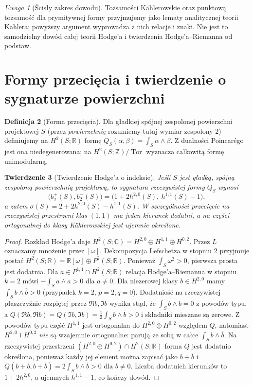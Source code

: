 \documentclass[11pt,a4paper,oneside]{report}
\newcommand{\R}{\mathbb{R}}
\newcommand{\C}{\mathbb{C}}
\newcommand{\Z}{\mathbb{Z}}
\theoremstyle{plain}
\newtheorem{twierdzenie}{Twierdzenie}[section]
\theoremstyle{definition}
\newtheorem{definicja}[twierdzenie]{Definicja}
\theoremstyle{remark}
\newtheorem{uwaga}[twierdzenie]{Uwaga}
\begin{document}
\begin{uwaga}[Ścisły zakres dowodu]
Tożsamości Kählerowskie oraz punktową tożsamość dla
prymitywnej formy przyjmujemy jako lematy analitycznej
teorii Kählera; powyższy argument wyprowadza z nich
relacje i znaki. Nie jest to samodzielny dowód całej
teorii Hodge'a i twierdzenia Hodge'a--Riemanna od podstaw.
\end{uwaga}

\section{Formy przecięcia i twierdzenie o sygnaturze powierzchni}
\begin{definicja}[Forma przecięcia]
Dla gładkiej spójnej zespolonej powierzchni projektowej $S$
(przez \emph{powierzchnię} rozumiemy tutaj wymiar zespolony $2$)
definiujemy na $H^2(S;\R)$ formę
$Q_S(\alpha,\beta)=\int_S\alpha\wedge\beta$.
Z dualności Poincarégo jest ona niedegenerowana;
na $H^2(S;\Z)/\operatorname{Tor}$ wyznacza całkowitą
formę unimodularną.
\end{definicja}
\begin{twierdzenie}[Twierdzenie Hodge'a o indeksie]
\label{thm:xvii-hodge-index}
Jeśli $S$ jest gładką, spójną zespoloną powierzchnią projektową,
to sygnatura rzeczywistej formy $Q_S$ wynosi
\[
\bigl(b_2^+(S),b_2^-(S)\bigr)
=\bigl(1+2h^{2,0}(S),\ h^{1,1}(S)-1\bigr),
\]
a zatem $\sigma(S)=2+2h^{2,0}(S)-h^{1,1}(S)$.
W szczególności przecięcie na rzeczywistej przestrzeni
klas $(1,1)$ ma jeden kierunek dodatni, a na części
ortogonalnej do klasy Kählerowskiej jest ujemnie określone.
\end{twierdzenie}
\begin{proof}
Rozkład Hodge'a daje
$H^2(S;\C)=H^{2,0}\oplus H^{1,1}\oplus H^{0,2}$.
Przez $L$ oznaczamy mnożenie przez $[\omega]$.
Dekompozycja Lefschetza w stopniu $2$ przyjmuje postać
$H^2(S;\R)=\R[\omega]\oplus P^2(S;\R)$.
Ponieważ $\int_S\omega^2>0$, pierwsza prosta jest dodatnia.
Dla $a\in P^{1,1}\cap H^2(S;\R)$ relacja
Hodge'a--Riemanna w stopniu $k=2$ mówi
$-\int_S a\wedge a>0$ dla $a\ne0$.
Dla niezerowej klasy $b\in H^{2,0}$ mamy
$\int_S b\wedge\overline b>0$ (przypadek $k=2$, $p=2,q=0$).
Dodatniość na rzeczywistej płaszczyźnie
rozpiętej przez $\Re b,\Im b$ wynika stąd, że
$\int_S b\wedge b=0$ z powodów typu, a
$Q(\Re b,\Re b)=Q(\Im b,\Im b)
=\frac12\int_S b\wedge\overline b>0$ i składniki
mieszane są zerowe. Z powodów typu część $H^{1,1}$ jest ortogonalna do
$H^{2,0}\oplus H^{0,2}$ względem $Q$, natomiast
$H^{2,0}$ i $H^{0,2}$ \emph{nie} są wzajemnie ortogonalne:
parują ze sobą w całce $\int_S b\wedge\overline b$.
Na rzeczywistej przestrzeni $(H^{2,0}\oplus H^{0,2})\cap
H^2(S;\R)$ forma $Q$ jest dodatnio określona,
ponieważ każdy jej element można zapisać jako $b+\overline b$
i $Q(b+\overline b,b+\overline b)=2\int_S b\wedge\overline b>0$
dla $b\ne0$.
Liczba dodatnich kierunków to $1+2h^{2,0}$,
a ujemnych $h^{1,1}-1$, co kończy dowód.
\end{proof}
\end{document}
